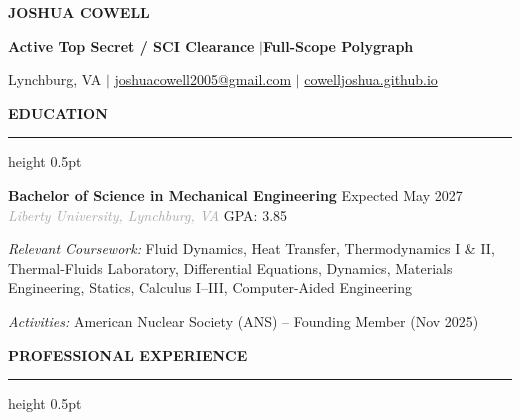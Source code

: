 \documentclass[10pt,letterpaper]{article}
\renewcommand{\section}[1]{
    \vspace{5pt}
    {\normalsize\bfseries\textcolor{navyblue}{\MakeUppercase{#1}}}
    \vspace{0pt}
    
    {\color{navyblue}\hrule height 0.5pt}
    \vspace{3pt}
}
\begin{document}
\begin{center}
    {\fontsize{20}{24}\selectfont\bfseries\textcolor{navyblue}{JOSHUA COWELL}}

    \vspace{3pt}

    {\small\textbf{\textcolor{navyblue}{Active Top Secret / SCI Clearance}} \enspace\textcolor{medgray}{$|$}\enspace \textbf{\textcolor{navyblue}{Full-Scope Polygraph}}}

    \vspace{3pt}

    {\small\color{darkgray}
    Lynchburg, VA \enspace\textcolor{medgray}{$|$}\enspace
    \href{mailto:joshuacowell2005@gmail.com}{joshuacowell2005@gmail.com} \enspace\textcolor{medgray}{$|$}\enspace
    \href{https://cowelljoshua.github.io}{cowelljoshua.github.io}
    }
\end{center}

\vspace{0pt}

\section{Education}

\textbf{Bachelor of Science in Mechanical Engineering} \hfill \textcolor{medgray}{Expected May 2027} \\
\textit{\textcolor{darkgray}{Liberty University, Lynchburg, VA}} \hfill \textcolor{medgray}{GPA: 3.85}

\vspace{1pt}
{\small \textit{Relevant Coursework:} Fluid Dynamics, Heat Transfer, Thermodynamics I \& II, Thermal-Fluids Laboratory, Differential Equations, Dynamics, Materials Engineering, Statics, Calculus I--III, Computer-Aided Engineering}

\vspace{1pt}
{\small \textit{Activities:} American Nuclear Society (ANS) -- Founding Member (Nov 2025)}

\vspace{1pt}

\section{Professional Experience}
\end{document}
